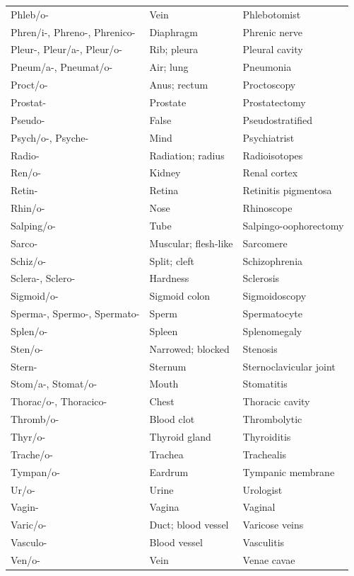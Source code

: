 \begin{longtable}{>{\raggedright\arraybackslash}p{} >{\raggedright\arraybackslash}p{} >{\raggedright\arraybackslash}p{}}
Phleb/o- & Vein & Phlebotomist \\
Phren/i-, Phreno-, Phrenico- & Diaphragm & Phrenic nerve \\
Pleur-, Pleur/a-, Pleur/o- & Rib; pleura & Pleural cavity \\
Pneum/a-, Pneumat/o- & Air; lung & Pneumonia \\
Proct/o- & Anus; rectum & Proctoscopy \\
Prostat- & Prostate & Prostatectomy \\
Pseudo- & False & Pseudostratified \\
Psych/o-, Psyche- & Mind & Psychiatrist \\
Radio- & Radiation; radius & Radioisotopes \\
Ren/o- & Kidney & Renal cortex \\
Retin- & Retina & Retinitis pigmentosa \\
Rhin/o- & Nose & Rhinoscope \\
Salping/o- & Tube & Salpingo-oophorectomy \\
Sarco- & Muscular; flesh-like & Sarcomere \\
Schiz/o- & Split; cleft & Schizophrenia \\
Sclera-, Sclero- & Hardness & Sclerosis \\
Sigmoid/o- & Sigmoid colon & Sigmoidoscopy \\
Sperma-, Spermo-, Spermato- & Sperm & Spermatocyte \\
Splen/o- & Spleen & Splenomegaly \\
Sten/o- & Narrowed; blocked & Stenosis \\
Stern- & Sternum & Sternoclavicular joint \\
Stom/a-, Stomat/o- & Mouth & Stomatitis \\
Thorac/o-, Thoracico- & Chest & Thoracic cavity \\
Thromb/o- & Blood clot & Thrombolytic \\
Thyr/o- & Thyroid gland & Thyroiditis \\
Trache/o- & Trachea & Trachealis \\
Tympan/o- & Eardrum & Tympanic membrane \\
Ur/o- & Urine & Urologist \\
Vagin- & Vagina & Vaginal \\
Varic/o- & Duct; blood vessel & Varicose veins \\
Vasculo- & Blood vessel & Vasculitis \\
Ven/o- & Vein & Venae cavae \\

\end{longtable}
